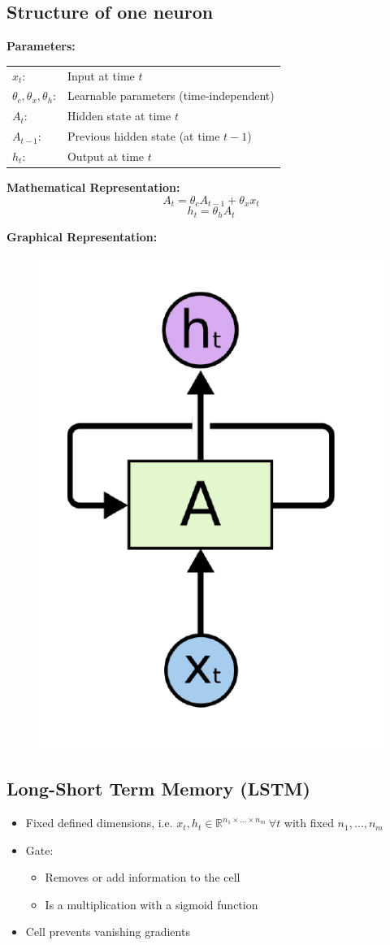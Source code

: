 \documentclass[10pt,a4paper]{article}
\newcommand{\props}{$\circ$}
\newcommand{\iprops}{\item[\props]}
\begin{document}
\subsection{Structure of one neuron}
\textbf{Parameters:} \\
\begin{tabular}{ll}
	$x_t$: & Input at time $t$ \\
	$\theta_c, \theta_x, \theta_h$: & Learnable parameters (time-independent) \\
	$A_t$: & Hidden state at time $t$ \\
	$A_{t-1}$: & Previous hidden state (at time $t-1$) \\
	$h_t$: & Output at time $t$
\end{tabular}

\textbf{Mathematical Representation:}
$$
	A_t = \theta_c A_{t-1} + \theta_x x_t
$$
$$
	h_t = \theta_h A_t
$$

\textbf{Graphical Representation:}
\begin{figure}[H]
	\includegraphics[width=0.3\columnwidth]{figures/rnn_neuron.png}
\end{figure}

\subsection{Long-Short Term Memory (LSTM)}
\begin{itemize}
	\iprops Fixed defined dimensions, i.e. $x_t, h_t \in \mathbb R^{n_1 \times \dots \times n_m}  ~\forall t$ with fixed $n_1, \dots, n_m$
	\iprops Gate:
	\begin{itemize}
		\item Removes or add information to the cell
		\item Is a multiplication with a sigmoid function
	\end{itemize}
	\iprops Cell prevents vanishing gradients
\end{itemize}
\end{document}

